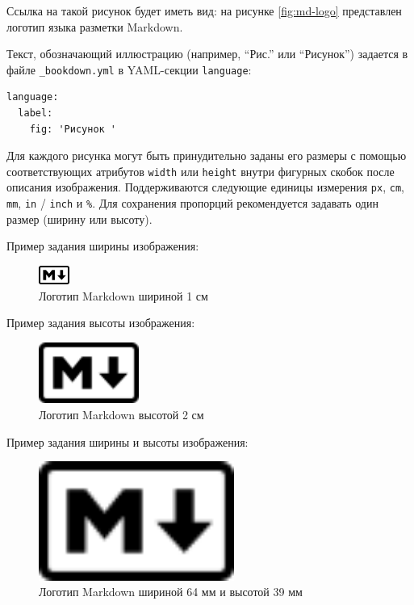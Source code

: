 \documentclass[
  a4paper,
]{book}
\theoremstyle{definition}
\theoremstyle{definition}
\theoremstyle{definition}
\theoremstyle{definition}
\theoremstyle{remark}
\begin{document}
Ссылка на такой рисунок будет иметь вид: на рисунке \ref{fig:md-logo} представлен логотип языка разметки Markdown.

Текст, обозначающий иллюстрацию (например, ``Рис.'' или ``Рисунок'') задается в файле \texttt{\_bookdown.yml} в YAML-секции \texttt{language}:

\begin{verbatim}
language:
  label:
    fig: 'Рисунок '
\end{verbatim}

Для каждого рисунка могут быть принудительно заданы его размеры с помощью соответствующих атрибутов \texttt{width} или \texttt{height} внутри фигурных скобок после описания изображения. Поддерживаются следующие единицы измерения \texttt{px}, \texttt{cm}, \texttt{mm}, \texttt{in} / \texttt{inch} и \texttt{\%}. Для сохранения пропорций рекомендуется задавать один размер (ширину или высоту).

Пример задания ширины изображения:

\begin{figure}
\centering
\includegraphics[width=1cm,height=\textheight]{figures/Markdown-mark.png}
\caption{\label{fig:md-logo-w-1cm} Логотип Markdown шириной 1 см}
\end{figure}

Пример задания высоты изображения:

\begin{figure}
\centering
\includegraphics[width=\textwidth,height=2cm]{figures/Markdown-mark.png}
\caption{\label{fig:md-logo-h-2cm} Логотип Markdown высотой 2 см}
\end{figure}

Пример задания ширины и высоты изображения:

\begin{figure}
\centering
\includegraphics[width=\textwidth,height=39mm]{figures/Markdown-mark.png}
\caption{\label{fig:md-logo-w-64mm-h-39mm} Логотип Markdown шириной 64 мм и высотой 39 мм}
\end{figure}
\end{document}
